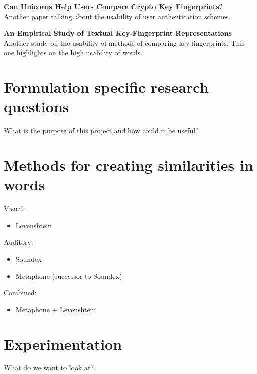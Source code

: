 \textbf{Can Unicorns Help Users Compare Crypto Key Fingerprints?}\\
Another paper talking about the usability of user authentication schemes.

\textbf{An Empirical Study of Textual Key-Fingerprint Representations}\\
Another study on the usability of methods of comparing key-fingerprints. This one highlights on the high usability of words.

\section{Formulation specific research questions}
What is the purpose of this project and how could it be useful?

\section{Methods for creating similarities in words}

Visual: 
\begin{itemize}
    \item Levenshtein 
\end{itemize}

Auditory:
\begin{itemize}
    \item Soundex
    \item Metaphone (successor to Soundex)
\end{itemize}

Combined:
\begin{itemize}
    \item Metaphone + Levenshtein
\end{itemize}

\section{Experimentation}
What do we want to look at?


